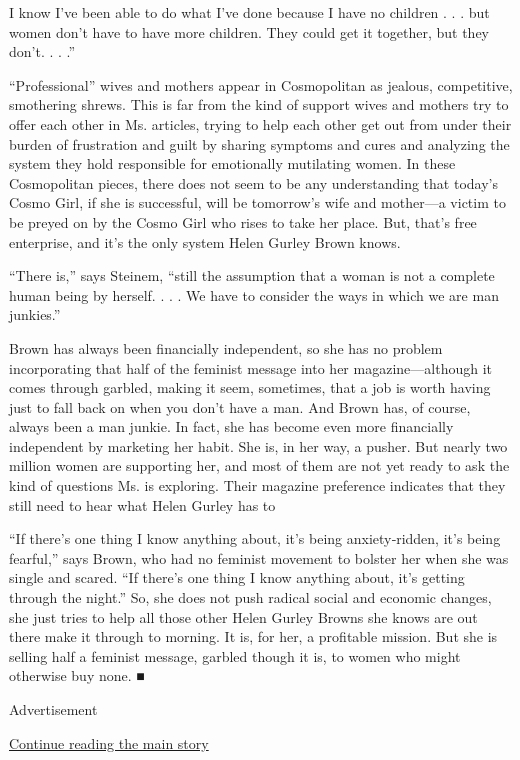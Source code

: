 I know I've been able to do what I've done because I have no children .
. . but women don't have to have more children. They could get it
together, but they don't. . . .''

``Professional'' wives and mothers appear in Cosmopolitan as jealous,
competitive, smothering shrews. This is far from the kind of support
wives and mothers try to offer each other in Ms. articles, trying to
help each other get out from under their burden of frustration and guilt
by sharing symptoms and cures and analyzing the system they hold
responsible for emotionally mutilating women. In these Cosmopolitan
pieces, there does not seem to be any understanding that today's Cosmo
Girl, if she is successful, will be tomorrow's wife and mother---a
victim to be preyed on by the Cosmo Girl who rises to take her place.
But, that's free enterprise, and it's the only system Helen Gurley Brown
knows.

``There is,'' says Steinem, ``still the assumption that a woman is not a
complete human being by herself. . . . We have to consider the ways in
which we are man junkies.''

Brown has always been financially independent, so she has no problem
incorporating that half of the feminist message into her
magazine---although it comes through garbled, making it seem, sometimes,
that a job is worth having just to fall back on when you don't have a
man. And Brown has, of course, always been a man junkie. In fact, she
has become even more financially independent by marketing her habit. She
is, in her way, a pusher. But nearly two million women are supporting
her, and most of them are not yet ready to ask the kind of questions Ms.
is exploring. Their magazine preference indicates that they still need
to hear what Helen Gurley has to

``If there's one thing I know anything about, it's being anxiety‐ridden,
it's being fearful,'' says Brown, who had no feminist movement to
bolster her when she was single and scared. ``If there's one thing I
know anything about, it's getting through the night.'' So, she does not
push radical social and economic changes, she just tries to help all
those other Helen Gurley Browns she knows are out there make it through
to morning. It is, for her, a profitable mission. But she is selling
half a feminist message, garbled though it is, to women who might
otherwise buy none. ■

Advertisement

\protect\hyperlink{after-bottom}{Continue reading the main story}


